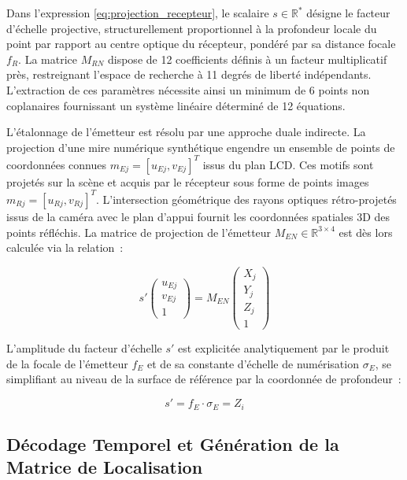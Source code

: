 \documentclass[10pt]{article} %
\begin{document}
Dans l'expression \eqref{eq:projection_recepteur}, le scalaire $s \in \mathbb{R}^*$ désigne le facteur d'échelle projective, structurellement proportionnel à la profondeur locale du point par rapport au centre optique du récepteur, pondéré par sa distance focale $f_R$. La matrice $M_{RN}$ dispose de 12 coefficients définis à un facteur multiplicatif près, restreignant l'espace de recherche à 11 degrés de liberté indépendants. L'extraction de ces paramètres nécessite ainsi un minimum de 6 points non coplanaires fournissant un système linéaire déterminé de 12 équations.

L'étalonnage de l'émetteur est résolu par une approche duale indirecte. La projection d'une mire numérique synthétique engendre un ensemble de points de coordonnées connues $m_{Ej} = [u_{Ej}, v_{Ej}]^T$ issus du plan LCD. Ces motifs sont projetés sur la scène et acquis par le récepteur sous forme de points images $m_{Rj} = [u_{Rj}, v_{Rj}]^T$. L'intersection géométrique des rayons optiques rétro-projetés issus de la caméra avec le plan d'appui fournit les coordonnées spatiales 3D des points réfléchis. La matrice de projection de l'émetteur $M_{EN} \in \mathbb{R}^{3 \times 4}$ est dès lors calculée via la relation~:

\begin{equation}
s' \begin{pmatrix} u_{Ej} \\ v_{Ej} \\ 1 \end{pmatrix} = M_{EN} \begin{pmatrix} X_j \\ Y_j \\ Z_j \\ 1 \end{pmatrix}
\label{eq:projection_emetteur}
\end{equation}

L'amplitude du facteur d'échelle $s'$ est explicitée analytiquement par le produit de la focale de l'émetteur $f_E$ et de sa constante d'échelle de numérisation $\sigma_{E}$, se simplifiant au niveau de la surface de référence par la coordonnée de profondeur~:

\begin{equation}
s' = f_E \cdot \sigma_E = Z_i
\end{equation}

\subsection{Décodage Temporel et Génération de la Matrice de Localisation}
\label{subsec:decodage_binaire}
\end{document}
